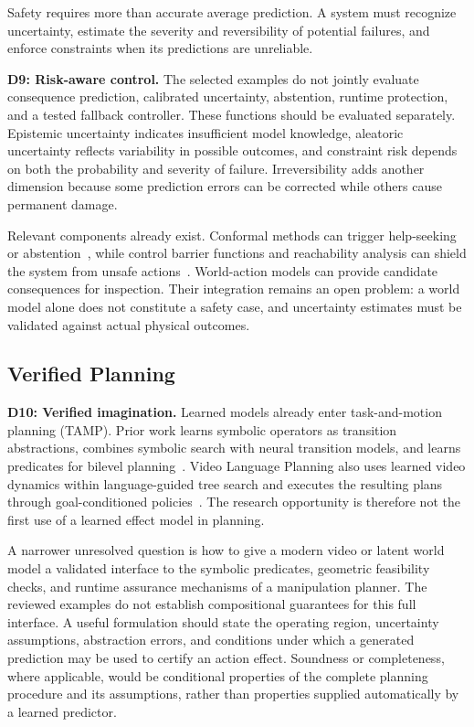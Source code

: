 \documentclass{ieeeaccess}
\begin{document}
Safety requires more than accurate average prediction. A system must recognize uncertainty, estimate the severity and reversibility of potential failures, and enforce constraints when its predictions are unreliable.

\noindent\textbf{D9: Risk-aware control.}
\textcolor[RGB]{104,48,148}{The selected examples do not jointly evaluate consequence prediction, calibrated uncertainty, abstention, runtime protection, and a tested fallback controller.} These functions should be evaluated separately. Epistemic uncertainty indicates insufficient model knowledge, aleatoric uncertainty reflects variability in possible outcomes, and constraint risk depends on both the probability and severity of failure. Irreversibility adds another dimension because some prediction errors can be corrected while others cause permanent damage.

Relevant components already exist. Conformal methods can trigger help-seeking or abstention~\cite{knowno}, while control barrier functions and reachability analysis can shield the system from unsafe actions~\cite{cbf,hjreach}. World-action models can provide candidate consequences for inspection. Their integration remains an open problem: a world model alone does not constitute a safety case, and uncertainty estimates must be validated against actual physical outcomes.

\subsection{Verified Planning}

\textcolor[RGB]{104,48,148}{\noindent\textbf{D10: Verified imagination.}
Learned models already enter task-and-motion planning (TAMP). Prior work learns symbolic operators as transition abstractions, combines symbolic search with neural transition models, and learns predicates for bilevel planning~\cite{silver2021operators,chitnis2022nsrt,silver2022predicates}. Video Language Planning also uses learned video dynamics within language-guided tree search and executes the resulting plans through goal-conditioned policies~\cite{vlp}. The research opportunity is therefore not the first use of a learned effect model in planning.}

\textcolor[RGB]{104,48,148}{A narrower unresolved question is how to give a modern video or latent world model a validated interface to the symbolic predicates, geometric feasibility checks, and runtime assurance mechanisms of a manipulation planner. The reviewed examples do not establish compositional guarantees for this full interface. A useful formulation should state the operating region, uncertainty assumptions, abstraction errors, and conditions under which a generated prediction may be used to certify an action effect. Soundness or completeness, where applicable, would be conditional properties of the complete planning procedure and its assumptions, rather than properties supplied automatically by a learned predictor.}
\end{document}
